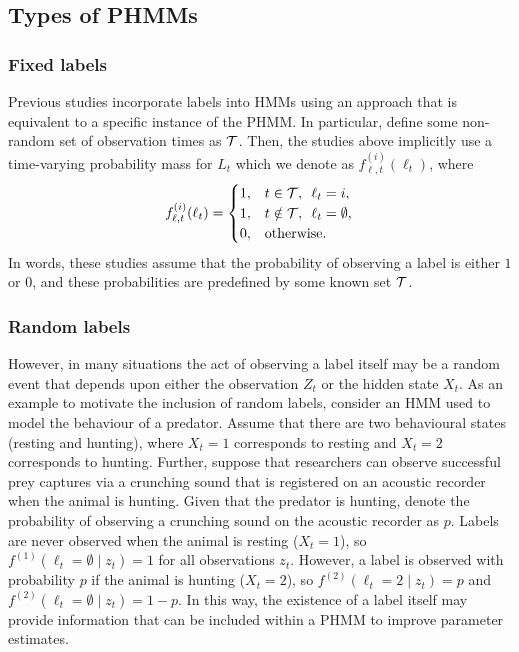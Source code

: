 \subsection{Types of PHMMs}

\subsubsection{Fixed labels}

Previous studies \citep{McClintock:2018,Li:2021} incorporate labels into HMMs using an approach that is equivalent to a specific instance of the PHMM. In particular, define some non-random set of observation times as $\mathcal{T}$. Then, the studies above implicitly use a time-varying probability mass for $L_t$ which we denote as $f_{\ell,t}^{(i)}(\ell_t)$, where
%
\begin{gather}
    f_{\ell,t}^{(i)}(\ell_t) = \begin{cases} 1, & t \in \mathcal{T}, \enspace \ell_t = i, \\ 
    1, & t \notin \mathcal{T}, \enspace \ell_t = \emptyset, \\ 
    0, & \text{otherwise}. \end{cases} \label{eqn:PHMM_emis_niave}
\end{gather}
%
In words, these studies assume that the probability of observing a label is either $1$ or $0$, and these probabilities are predefined by some known set $\mathcal{T}$.

\subsubsection{Random labels}

However, in many situations the act of observing a label itself may be a random event that depends upon either the observation $Z_t$ or the hidden state $X_t$. As an example to motivate the inclusion of random labels, consider an HMM used to model the behaviour of a predator. Assume that there are two behavioural states (resting and hunting), where $X_t = 1$ corresponds to resting and $X_t = 2$ corresponds to hunting. Further, suppose that researchers can observe successful prey captures via a crunching sound that is registered on an acoustic recorder when the animal is hunting. Given that the predator is hunting, denote the probability of observing a crunching sound on the acoustic recorder as $p$. Labels are never observed when the animal is resting ($X_t = 1$), so $f^{(1)}(\ell_t = \emptyset \mid z_t) = 1$ for all observations $z_t$. However, a label is observed with probability $p$ if the animal is hunting ($X_t = 2$), so $f^{(2)}(\ell_t = 2 \mid z_t) = p$ and $f^{(2)}(\ell_t = \emptyset \mid z_t) = 1-p$. In this way, the existence of a label itself may provide information that can be included within a PHMM to improve parameter estimates.


